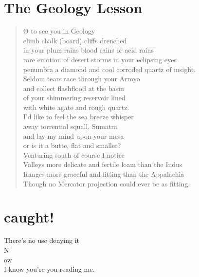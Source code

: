 \documentclass[times,12pt]{book}
\begin{document}
\section*{The Geology Lesson}
\begin{verse}
O to see you in Geology\\
climb chalk (board) cliffs drenched\\
in your plum rains blood rains or acid rains\\
rare emotion of desert storms in your eclipsing eyes\\
penumbra a diamond and cool corroded quartz of insight.\\[12pt]

Seldom tears race through your Arroyo\\
and collect flashflood at the basin\\
of your shimmering reservoir lined\\
with white agate and rough quartz.\\[12pt]

I'd like to feel the sea breeze whisper\\
away torrential squall, Sumatra\\
and lay my mind upon your mesa\\
or is it a butte, flat and smaller?\\[12pt]

Venturing south of course I notice\\
Valleys more delicate and fertile loam than the Indus\\
Ranges more graceful and fitting than the Appalachia\\
Though no Mercator projection could ever be as fitting.
\end{verse}
\newpage

\section*{caught!}
\begin{tabbing}
There's \=no use denying it\\
\>N\\
\>ow\\
I know you're you reading me.
\end{tabbing}
\newpage
\end{document}
